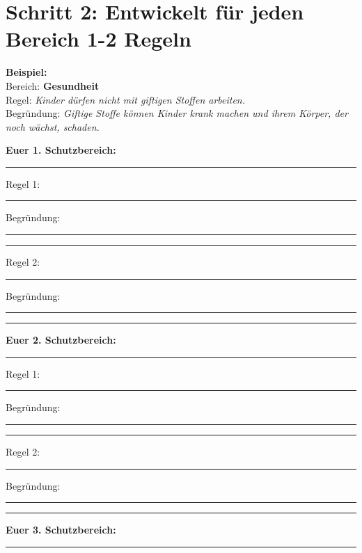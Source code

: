 \documentclass[12pt, a4paper]{article}
\newenvironment{taskbox}{%
    \begin{framed}
        \color{black}
    }{%
    \end{framed}
}
\newenvironment{examplebox}{%
    \begin{framed}
        \setlength{\fboxsep}{10pt}
        \color{black}
        \itshape
    }{%
    \end{framed}
}
\begin{document}
    \section*{\large\color{headercolor}Schritt 2: Entwickelt für jeden Bereich 1-2 Regeln}
    
    \begin{examplebox}
        \textbf{Beispiel:}\\
        Bereich: \textbf{Gesundheit}\\
        Regel: \textit{Kinder dürfen nicht mit giftigen Stoffen arbeiten.}\\
        Begründung: \textit{Giftige Stoffe können Kinder krank machen und ihrem Körper, der noch wächst, schaden.}
    \end{examplebox}

    \vspace{0.3cm}

    \textbf{\color{sectioncolor}Euer 1. Schutzbereich:} \rule{8cm}{0.4pt}

    \begin{taskbox}
        Regel 1: \rule{\linewidth}{0.4pt}

        Begründung: \rule{\linewidth}{0.4pt}
        \rule{\linewidth}{0.4pt}

        \vspace{0.5cm}

        Regel 2: \rule{\linewidth}{0.4pt}

        Begründung: \rule{\linewidth}{0.4pt}
        \rule{\linewidth}{0.4pt}
    \end{taskbox}

    \vspace{0.3cm}

    \textbf{\color{sectioncolor}Euer 2. Schutzbereich:} \rule{8cm}{0.4pt}

    \begin{taskbox}
        Regel 1: \rule{\linewidth}{0.4pt}

        Begründung: \rule{\linewidth}{0.4pt}
        \rule{\linewidth}{0.4pt}

        \vspace{0.5cm}

        Regel 2: \rule{\linewidth}{0.4pt}

        Begründung: \rule{\linewidth}{0.4pt}
        \rule{\linewidth}{0.4pt}
    \end{taskbox}

    \textbf{\color{sectioncolor}Euer 3. Schutzbereich:} \rule{8cm}{0.4pt}
\end{document}
